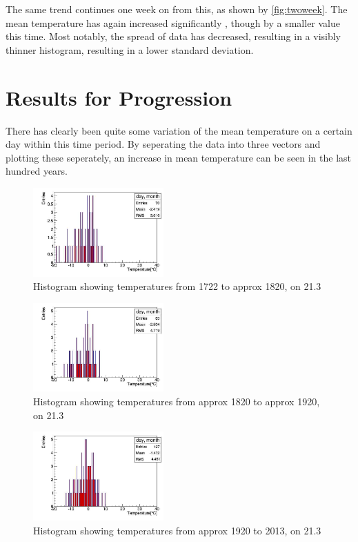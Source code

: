 \documentclass[a4paper,10pt,oneside]{article}
\begin{document}
The same trend continues one week on from this, as shown by \ref{fig:twoweek}. The mean temperature has again increased significantly
, though by a smaller value this time. Most notably, the spread of data has decreased, resulting in a visibly thinner histogram, resulting
in a lower standard deviation.

\section{Results for Progression}
\label{sec:prog}

There has clearly been quite some variation of the mean temperature on a certain day within
this time period. By seperating the data into three vectors and plotting these seperately, an increase
in mean temperature can be seen in the last hundred years.
\begin{figure}[!ht]
 \includegraphics[width=5cm]{../Code/1.jpg}
 \caption{Histogram showing temperatures from 1722 to approx 1820, on 21.3}
 \label{fig:one}
\end{figure}

\begin{figure}[!ht]
 \includegraphics[width=5cm]{../Code/2.jpg}
 \caption{Histogram showing temperatures from approx 1820 to approx 1920, on 21.3}
 \label{fig:two}
\end{figure}

\begin{figure}[!ht]
 \includegraphics[width=5cm]{../Code/3.jpg}
 \caption{Histogram showing temperatures from approx 1920 to 2013, on 21.3}
 \label{fig:three}
\end{figure}
\end{document}
